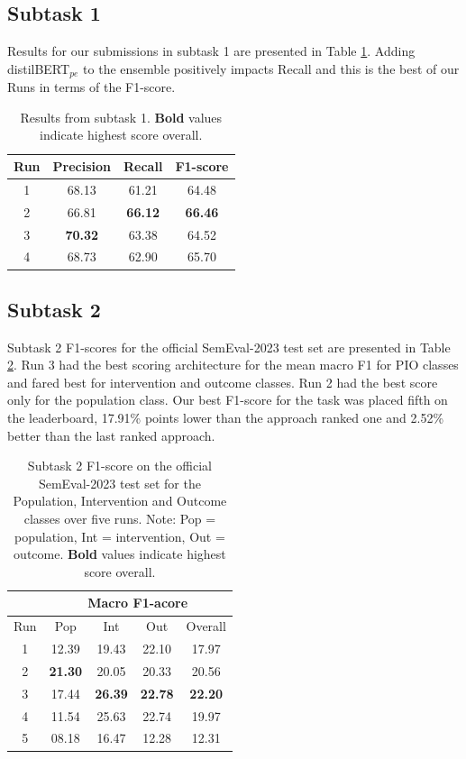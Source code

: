 \documentclass[11pt]{article}
\begin{document}
\subsection{Subtask 1}
\label{res:task1}
%
Results for our submissions in subtask 1 are presented in Table \ref{tab:task_1}. 
Adding  distilBERT$_{pe}$ to the ensemble positively impacts Recall and this is the best of our Runs in terms of the F1-score.

\begin{table}[ht]
    \centering
    \begin{tabular}{cccc}
        \toprule
        Run & Precision & Recall & F1-score \\
        \midrule
        1 & 68.13 & 61.21 & 64.48 \\
        2 & 66.81 & \textbf{66.12} & \textbf{66.46} \\
        3 & \textbf{70.32} & 63.38 & 64.52 \\
        4 & 68.73 & 62.90 & 65.70 \\
        \bottomrule
    \end{tabular}
    \caption{Results from subtask 1. \textbf{Bold} values indicate highest score overall.}
    \label{tab:task_1}
\end{table}
%
%
%
\subsection{Subtask 2}
\label{res:task2}
%
Subtask 2 F1-scores for the official SemEval-2023 test set are presented in Table \ref{tab:task_2}.
Run 3 had the best scoring architecture for the mean macro F1 for PIO classes and fared best for intervention and outcome classes.
Run 2 had the best score only for the population class.
Our best F1-score for the task was placed fifth on the leaderboard, 17.91\% points lower than the approach ranked one and 2.52\% better than the last ranked approach.
%
\begin{table}[ht]
    \centering
    \begin{tabular}{ccccc}
        \toprule
          & \multicolumn{4}{c}{Macro F1-acore} \\
         \hline
        Run & Pop & Int & Out & Overall \\
        \midrule
        1 & 12.39 & 19.43 & 22.10 & 17.97 \\
        2 & \textbf{21.30} & 20.05 & 20.33 & 20.56  \\
        3 & 17.44 & \textbf{26.39} & \textbf{22.78} & \textbf{22.20} \\
        4 & 11.54 & 25.63 & 22.74 & 19.97 \\
        5 & 08.18 & 16.47 & 12.28 & 12.31 \\
        \bottomrule
    \end{tabular}
    \caption{Subtask 2 F1-score on the official SemEval-2023 test set for the Population, Intervention and Outcome classes over five runs. Note: Pop = population, Int = intervention, Out = outcome. \textbf{Bold} values indicate highest score overall.}
    \label{tab:task_2}
\end{table}
%
%
%
\end{document}
